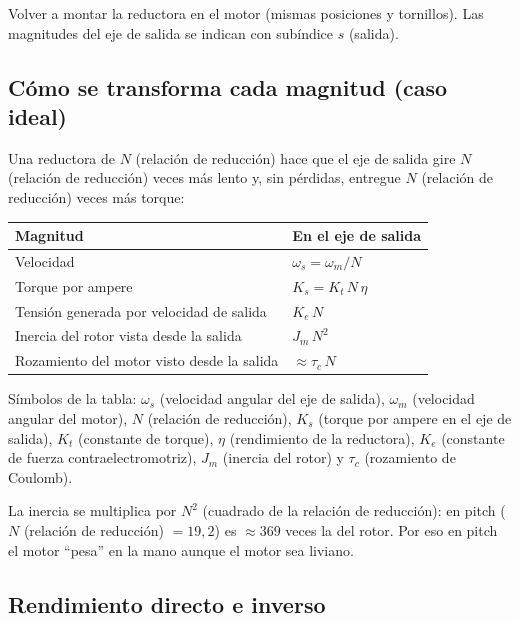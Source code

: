 \documentclass[11pt,a4paper]{article}
\begin{document}
Volver a montar la reductora en el motor (mismas posiciones y tornillos). Las magnitudes del eje de salida se indican con subíndice $s$ (salida).

\subsection{Cómo se transforma cada magnitud (caso ideal)}

Una reductora de $N$ (relación de reducción) hace que el eje de salida gire $N$ (relación de reducción) veces más lento y, sin pérdidas, entregue $N$ (relación de reducción) veces más torque:
\begin{center}
\begin{tabular}{ll}
\toprule
Magnitud & En el eje de salida \\
\midrule
Velocidad & $\omega_s = \omega_m / N$ \\
Torque por ampere & $K_s = K_t\,N\,\eta$ \quad [N\,m/A] \\
Tensión generada por velocidad de salida & $K_e\,N$ \quad [V\,s/rad] \\
Inercia del rotor vista desde la salida & $J_m\,N^2$ \\
Rozamiento del motor visto desde la salida & $\approx \tau_c\,N$ \\
\bottomrule
\end{tabular}
\end{center}
Símbolos de la tabla: $\omega_s$ (velocidad angular del eje de salida), $\omega_m$ (velocidad angular del motor), $N$ (relación de reducción), $K_s$ (torque por ampere en el eje de salida), $K_t$ (constante de torque), $\eta$ (rendimiento de la reductora), $K_e$ (constante de fuerza contraelectromotriz), $J_m$ (inercia del rotor) y $\tau_c$ (rozamiento de Coulomb).

La inercia se multiplica por $N^2$ (cuadrado de la relación de reducción): en pitch ($N$ (relación de reducción) $= 19{,}2$) es $\approx 369$ veces la del rotor. Por eso en pitch el motor ``pesa'' en la mano aunque el motor sea liviano.

\subsection{Rendimiento directo e inverso}
\end{document}
